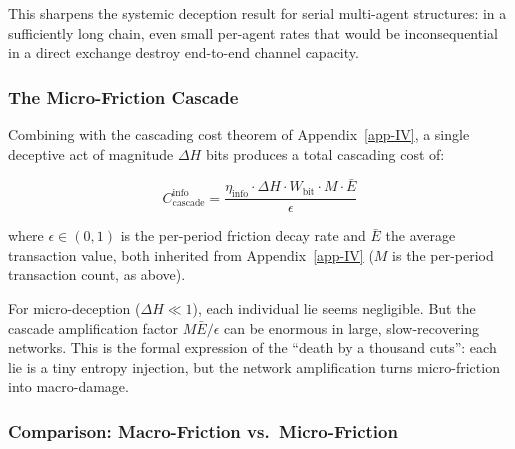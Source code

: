\documentclass[11pt]{article}
\theoremstyle{plain}
\theoremstyle{definition}
\theoremstyle{remark}
\let\origsubsubsection\subsubsection
\renewcommand{\subsubsection}{\needspace{4\baselineskip}\origsubsubsection}
\begin{document}
This sharpens the systemic deception result for serial multi-agent
structures: in a sufficiently long chain, even small per-agent rates
that would be inconsequential in a direct exchange destroy end-to-end
channel capacity.

\subsubsection{The Micro-Friction
Cascade}\label{the-micro-friction-cascade}

Combining with the cascading cost theorem of Appendix~\ref{app-IV}, a
single deceptive act of magnitude \(\Delta H\) bits produces a total
cascading cost of:

\[C_{\text{cascade}}^{\text{info}} = \frac{\eta_{\text{info}} \cdot \Delta H \cdot W_{\text{bit}} \cdot M \cdot \bar{E}}{\epsilon}\]

where \(\epsilon \in (0, 1)\) is the per-period friction decay rate and
\(\bar{E}\) the average transaction value, both inherited from
Appendix~\ref{app-IV} (\(M\) is the per-period transaction count, as
above).

For micro-deception (\(\Delta H \ll 1\)), each individual lie seems
negligible. But the cascade amplification factor
\(M \bar{E} / \epsilon\) can be enormous in large, slow-recovering
networks. This is the formal expression of the ``death by a thousand
cuts'': each lie is a tiny entropy injection, but the network
amplification turns micro-friction into macro-damage.

\subsubsection{Comparison: Macro-Friction
vs.~Micro-Friction}\label{comparison-macro-friction-vs.-micro-friction}
\end{document}

